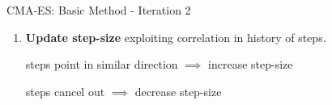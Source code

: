 \documentclass[11pt,compress,t,notes=noshow, xcolor=table]{beamer}
\begin{document}
\begin{vbframe}{CMA-ES: Basic Method - Iteration 2}
\begin{enumerate}
    \item \textbf{Update step-size} exploiting correlation in history of steps.
    
        steps point in similar direction $\implies$ increase step-size
        
        steps cancel out $\implies$ decrease step-size
        

\end{enumerate}
\end{vbframe}

%
%
%
%
%
%
%
%
%
\end{document}
